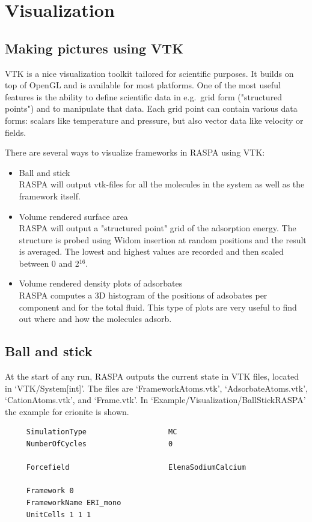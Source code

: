 \chapter{Visualization}

\section{Making pictures using VTK}

VTK is a nice visualization toolkit tailored for scientific purposes. It builds on top of OpenGL and is available
for most platforms. One of the most useful features is the ability to define scientific data in e.g.\
grid form ("structured points") and to manipulate that data. Each grid point can contain various data forms:
scalars like temperature and pressure, but also vector data like velocity or fields.

There are several ways to visualize frameworks in RASPA using VTK:
\begin{itemize}
  \item{Ball and stick}\\
  RASPA will output vtk-files for all the molecules in the system as well as the framework itself.
  \item{Volume rendered surface area}\\
  RASPA will output a "structured point" grid of the adsorption energy. The structure is probed using Widom insertion
  at random positions and the result is averaged. The lowest and highest values are recorded and then scaled between
  0 and 2$^{16}$.
  \item{Volume rendered density plots of adsorbates}\\
  RASPA computes a 3D histogram of the positions of adsobates per component and for the total fluid.
  This type of plots are very useful to find out where and how the molecules adsorb.
\end{itemize}

\section{Ball and stick}

At the start of any run, RASPA outputs the current state in VTK files, located in `VTK/System[int]'. The files
are `FrameworkAtoms.vtk', `AdsorbateAtoms.vtk', `CationAtoms.vtk', and `Frame.vtk'. In 
`Example/Visualization/BallStickRASPA' the example for erionite is shown.
\begin{verbatim}
     SimulationType                   MC
     NumberOfCycles                   0

     Forcefield                       ElenaSodiumCalcium

     Framework 0
     FrameworkName ERI_mono
     UnitCells 1 1 1
\end{verbatim}

